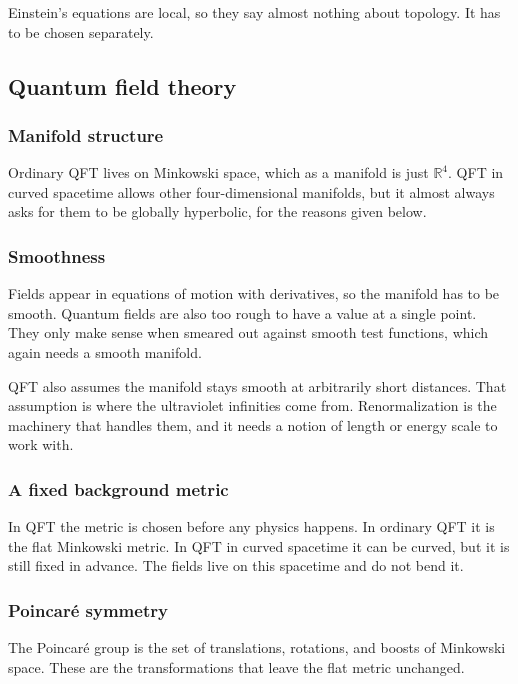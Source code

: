 Einstein's equations are local, so they say almost nothing about topology.
It has to be chosen separately.

\subsection{Quantum field theory}

\subsubsection{Manifold structure}

Ordinary QFT lives on Minkowski space, which as a manifold is just $\mathbb{R}^4$.
QFT in curved spacetime allows other four-dimensional manifolds, but it almost always asks for them to be globally hyperbolic, for the reasons given below.

\subsubsection{Smoothness}

Fields appear in equations of motion with derivatives, so the manifold has to be smooth.
Quantum fields are also too rough to have a value at a single point.
They only make sense when smeared out against smooth test functions, which again needs a smooth manifold.

QFT also assumes the manifold stays smooth at arbitrarily short distances.
That assumption is where the ultraviolet infinities come from.
Renormalization is the machinery that handles them, and it needs a notion of length or energy scale to work with.

\subsubsection{A fixed background metric}

In QFT the metric is chosen before any physics happens.
In ordinary QFT it is the flat Minkowski metric.
In QFT in curved spacetime it can be curved, but it is still fixed in advance.
The fields live on this spacetime and do not bend it.

\subsubsection{Poincar\'e symmetry}

The Poincar\'e group is the set of translations, rotations, and boosts of Minkowski space.
These are the transformations that leave the flat metric unchanged.

